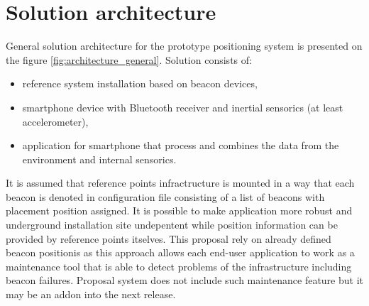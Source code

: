 \documentclass[../main.tex]{subfiles}
\begin{document}

\section{Solution architecture} %
\label{sec:solution_architecture}

General solution architecture for the prototype positioning system is presented on the figure \ref{fig:architecture_general}. Solution consists of:
\begin{itemize}
	\item reference system installation based on beacon devices,
	\item smartphone device with Bluetooth receiver and inertial sensorics (at least accelerometer),
	\item application for smartphone that process and combines the data from the environment and internal sensorics.
\end{itemize}

It is assumed that reference points infractructure is mounted in a way that each beacon is denoted in configuration file consisting of a list of beacons with placement position assigned. It is possible to make application more robust and underground installation site undepentent while position information can be provided by reference points itselves. This proposal rely on already defined beacon positionis as this approach allows each end-user application to work as a maintenance tool that is able to detect problems of the infrastructure including beacon failures. Proposal system does not include such maintenance feature but it may be an addon into the next release.
\end{document}
